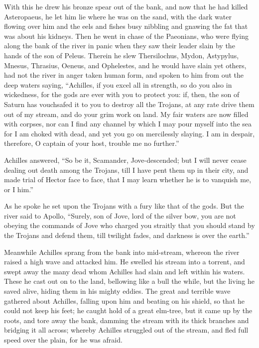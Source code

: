With this he drew his bronze spear out of the bank, and now that he had
killed Asteropaeus, he let him lie where he was on the sand, with the dark
water flowing over him and the eels and fishes busy nibbling and gnawing
the fat that was about his kidneys. Then he went in chase of the
Paeonians, who were flying along the bank of the river in panic when they
saw their leader slain by the hands of the son of Peleus. Therein he slew
Thersilochus, Mydon, Astypylus, Mnesus, Thrasius, Oeneus, and Ophelestes,
and he would have slain yet others, had not the river in anger taken human
form, and spoken to him from out the deep waters saying, “Achilles, if you
excel all in strength, so do you also in wickedness, for the gods are ever
with you to protect you: if, then, the son of Saturn has vouchsafed it to
you to destroy all the Trojans, at any rate drive them out of my stream,
and do your grim work on land. My fair waters are now filled with corpses,
nor can I find any channel by which I may pour myself into the sea for I
am choked with dead, and yet you go on mercilessly slaying. I am in
despair, therefore, O captain of your host, trouble me no further.”

Achilles answered, “So be it, Scamander, Jove-descended; but I will never
cease dealing out death among the Trojans, till I have pent them up in
their city, and made trial of Hector face to face, that I may learn
whether he is to vanquish me, or I him.”

As he spoke he set upon the Trojans with a fury like that of the gods. But
the river said to Apollo, “Surely, son of Jove, lord of the silver bow,
you are not obeying the commands of Jove who charged you straitly that you
should stand by the Trojans and defend them, till twilight fades, and
darkness is over the earth.”

Meanwhile Achilles sprang from the bank into mid-stream, whereon the river
raised a high wave and attacked him. He swelled his stream into a torrent,
and swept away the many dead whom Achilles had slain and left within his
waters. These he cast out on to the land, bellowing like a bull the while,
but the living he saved alive, hiding them in his mighty eddies. The great
and terrible wave gathered about Achilles, falling upon him and beating on
his shield, so that he could not keep his feet; he caught hold of a great
elm-tree, but it came up by the roots, and tore away the bank, damming the
stream with its thick branches and bridging it all across; whereby
Achilles struggled out of the stream, and fled full speed over the plain,
for he was afraid.

